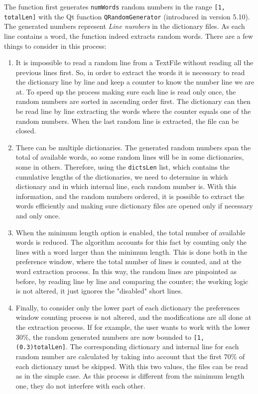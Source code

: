 The function first generates \texttt{numWords} random numbers in the range \texttt{[1, totalLen]} with the Qt function \texttt{QRandomGenerator} (introduced in version 5.10). The generated numbers represent \textsl{Line numbers} in the dictionary files. As each line contains a word, the function indeed extracts random words. There are a few things to consider in this process:
\begin{enumerate}
\setlength\itemsep{0pt}
\item It is impossible to read a random line from a TextFile without reading all the previous lines first. So, in order to extract the words it is necessary to read the dictionary line by line and keep a counter to know the number line we are at. To speed up the process making sure each line is read only once, the random numbers are sorted in ascending order first. The dictionary can then be read line by line extracting the words where the counter equals one of the random numbers. When the last random line is extracted, the file can be closed.

\item There can be multiple dictionaries. The generated random numbers span the total of available words, so some random lines will be in some dictionaries, some in others. Therefore, using the \texttt{dictsLen} list, which contains the cumulative lengths of the dictionaries, we need to determine in which dictionary and in which internal line, each random number is. With this information, and the random numbers ordered, it is possible to extract the words efficiently and making sure dictionary files are opened only if necessary and only once.

\item When the minimum length option is enabled, the total number of available words is reduced. The algorithm accounts for this fact by counting only the lines with a word larger than the minimum length. This is done both in the preference window, where the total number of lines is counted, and at the word extraction process. In this way, the random lines are pinpointed as before, by reading line by line and comparing the counter; the working logic is not altered, it just ignores the "disabled" short lines.

\item Finally, to consider only the lower part of each dictionary the preferences window counting process is not altered, and the modifications are all done at the extraction process. If for example, the user wants to work with the lower 30\%, the random generated numbers are now bounded to \texttt{[1,  (0.3)totalLen]}. The corresponding dictionary and internal line for each random number are calculated by taking into account that the first 70\% of each dictionary must be skipped. With this two values, the files can be read as in the simple case. As this process is different from the minimum length one, they do not interfere with each other.

\end{enumerate}

